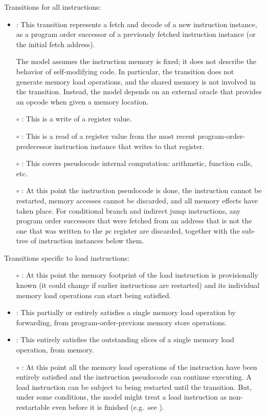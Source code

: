 \noindent Transitions for all instructions:
\begin{itemize}
\item {}: This transition represents a fetch and
  decode of a new instruction instance, as a program order successor
  of a previously fetched instruction instance (or the initial fetch
  address).

The model assumes the instruction memory is fixed; it does not
describe the behavior of self-modifying code. 
In particular, the  transition does not generate memory load operations, and the shared memory is not involved in the transition.
Instead, the model depends on an external oracle that provides an opcode when given a memory location.
%


\item[$\circ$] : This is a write of a register value.
\item[$\circ$] : This is a read of a register
  value from the most recent program-order-predecessor instruction instance that writes to that register.
\item[$\circ$] : This covers pseudocode
  internal computation: arithmetic, function calls, etc.
\item[$\circ$] : At this point the instruction pseudocode is done, the instruction cannot be restarted, memory accesses cannot be discarded, and all memory effects have taken place.
For conditional branch and indirect jump instructions, any program order successors that were fetched from an address that is not the one that was written to the {\em pc} register are discarded, together with the sub-tree of instruction instances below them.
\end{itemize}

\noindent Transitions specific to load instructions:
\begin{itemize}
\item[$\circ$] : At this point the memory
  footprint of the load instruction is provisionally known (it could change if
  earlier instructions are restarted) and its individual memory load operations can start being satisfied.
\item {}: This partially or entirely
  satisfies a single memory load operation by forwarding, from
  program-order-previous memory store operations.
\item {}: This entirely satisfies the outstanding slices of a single memory load operation, from memory.
\item[$\circ$] : At this point all the memory load operations of the instruction have been entirely satisfied and the instruction pseudocode can continue executing.
A load instruction can be subject to being restarted until the  transition.
But, under some conditions, the model might treat a load instruction as non-restartable even before it is finished (e.g.~see ).
\end{itemize}

